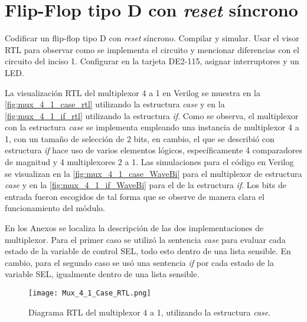 \section{Flip-Flop tipo D con \textit{reset} síncrono \label{sec:s2}}

\begin{center}
	\begin{minipage}{12cm}
		\begin{tcolorbox}[title=Actividad 2]
			Codificar un flip-flop tipo D con \textit{reset} síncrono. Compilar y simular. Usar el visor RTL para observar como se implementa el circuito y mencionar diferencias con el circuito del inciso 1. Configurar en la tarjeta DE2-115, asignar interruptores y un LED.
		\end{tcolorbox}	
	\end{minipage}
\end{center}

La visualización RTL del multiplexor 4 a 1 en Verilog se muestra en la \autoref{fig:mux_4_1_case_rtl} utilizando la estructura \textit{case} y en la \autoref{fig:mux_4_1_if_rtl} utilizando la estructura \textit{if}. Como se observa, el multiplexor con la estructura \textit{case} se implementa empleando una instancia de multiplexor 4 a 1, con un tamaño de selección de 2 bits, en cambio, el que se describió con estructura \textit{if} hace uso de varios elementos lógicos, específicamente 4 comparadores de magnitud y 4 multiplexores 2 a 1. Las simulaciones para el código en Verilog se visualizan en la \autoref{fig:mux_4_1_case_WaveBi} para el multiplexor de estructura \textit{case} y en la \autoref{fig:mux_4_1_if_WaveBi} para el de la estructura \textit{if}. Los bits de entrada fueron escogidos de tal forma que se observe de manera clara el funcionamiento del módulo.

En los Anexos se localiza la descripción de las dos implementaciones de multiplexor. Para el primer caso se utilizó la sentencia \textit{case} para evaluar cada estado de la variable de control SEL, todo esto dentro de una lista sensible. En cambio, para el segundo caso se usó una sentencia \textit{if} por cada estado de la variable SEL, igualmente dentro de una lista sensible.

\begin{figure}[ht]
	\centering
	\texttt{[image: Mux\_4\_1\_Case\_RTL.png]}
	\caption{Diagrama RTL del multiplexor 4 a 1, utilizando la estructura \textit{case}. \label{fig:mux_4_1_case_rtl}}
\end{figure}

